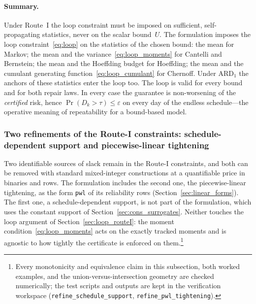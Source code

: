 \documentclass[11pt,a4paper]{article}
\theoremstyle{plain}
\theoremstyle{definition}
\theoremstyle{remark}
\begin{document}
\paragraph{Summary.}
Under Route~I the loop constraint must be imposed on sufficient, self-propagating statistics, never on the scalar bound~$U$.
The formulation imposes the loop constraint~\eqref{eq:loop} on the statistics of the chosen bound: the mean for Markov; the mean and the variance~\eqref{eq:loop_moments} for Cantelli and Bernstein; the mean and the Hoeffding budget for Hoeffding; the mean and the cumulant generating function~\eqref{eq:loop_cumulant} for Chernoff.
Under $\text{ARD}_1$ the anchors of these statistics enter the loop too.
The loop is valid for every bound and for both repair laws.
In every case the guarantee is non-worsening of the \emph{certified} risk, hence $\Pr(D_k > \tau) \le \varepsilon$ on every day of the endless schedule---the operative meaning of repeatability for a bound-based model.

\subsubsection{Two refinements of the Route-I constraints: schedule-dependent support and piecewise-linear tightening}
\label{sec:routeI_refinements}

Two identifiable sources of slack remain in the Route-I constraints, and both can be removed with standard mixed-integer constructions at a quantifiable price in binaries and rows.
The formulation includes the second one, the piecewise-linear tightening, as the form \texttt{pwl} of its reliability rows (Section~\ref{sec:linear_forms}).
The first one, a schedule-dependent support, is not part of the formulation, which uses the constant support of Section~\ref{sec:cons_surrogates}.
Neither touches the loop argument of Section~\ref{sec:loop_routeI}: the moment condition~\eqref{eq:loop_moments} acts on the exactly tracked moments and is agnostic to how tightly the certificate is enforced on them.\footnote{Every monotonicity and equivalence claim in this subsection, both worked examples, and the union-versus-intersection geometry are checked numerically; the test scripts and outputs are kept in the verification workspace (\texttt{refine\_schedule\_support}, \texttt{refine\_pwl\_tightening}).}
\end{document}

